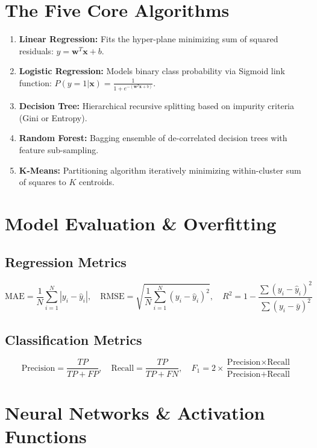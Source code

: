 \documentclass[11pt,a4paper]{article}
\begin{document}
\section{The Five Core Algorithms}
\begin{enumerate}
    \item \textbf{Linear Regression:} Fits the hyper-plane minimizing sum of squared residuals: $y = \mathbf{w}^T\mathbf{x} + b$.
    \item \textbf{Logistic Regression:} Models binary class probability via Sigmoid link function: $P(y=1|\mathbf{x}) = \frac{1}{1 + e^{-(\mathbf{w}^T\mathbf{x} + b)}}$.
    \item \textbf{Decision Tree:} Hierarchical recursive splitting based on impurity criteria (Gini or Entropy).
    \item \textbf{Random Forest:} Bagging ensemble of de-correlated decision trees with feature sub-sampling.
    \item \textbf{K-Means:} Partitioning algorithm iteratively minimizing within-cluster sum of squares to $K$ centroids.
\end{enumerate}

\section{Model Evaluation \& Overfitting}
\subsection{Regression Metrics}
\begin{equation}
\text{MAE} = \frac{1}{N}\sum_{i=1}^N |y_i - \hat{y}_i|, \quad \text{RMSE} = \sqrt{\frac{1}{N}\sum_{i=1}^N (y_i - \hat{y}_i)^2}, \quad R^2 = 1 - \frac{\sum (y_i - \hat{y}_i)^2}{\sum (y_i - \bar{y})^2}
\end{equation}

\subsection{Classification Metrics}
\begin{equation}
\text{Precision} = \frac{TP}{TP + FP}, \quad \text{Recall} = \frac{TP}{TP + FN}, \quad F_1 = 2 \times \frac{\text{Precision} \times \text{Recall}}{\text{Precision} + \text{Recall}}
\end{equation}

\section{Neural Networks \& Activation Functions}
\end{document}
